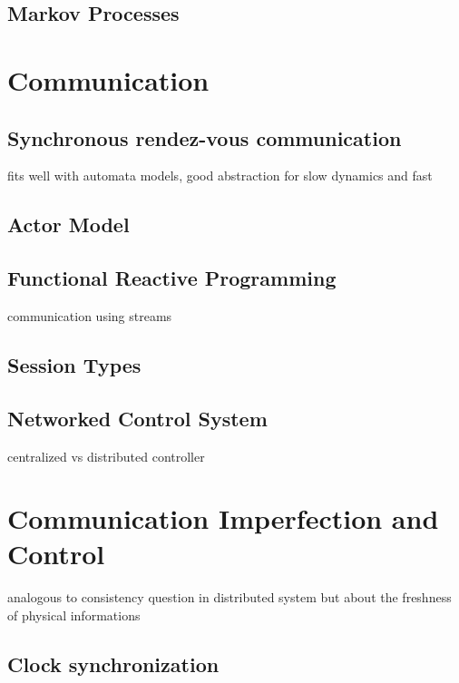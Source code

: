 \documentclass[
graybox,
envcountchap,
natbib
]{svmult}
\begin{document}
\begin{bibunit}
         \subsection{Markov Processes}

         \section{Communication} %

         \subsection{Synchronous rendez-vous communication}

         fits well with automata models, good abstraction for slow dynamics and fast

         \subsection{Actor Model}

         \subsection{Functional Reactive Programming}

         communication using streams

         \subsection{Session Types}


         \subsection{Networked Control System}

         centralized vs distributed controller

         \section{Communication Imperfection and Control} %

         analogous to consistency question in distributed system but about the freshness of physical informations

         \subsection{Clock synchronization}


\end{bibunit}
\end{document}
